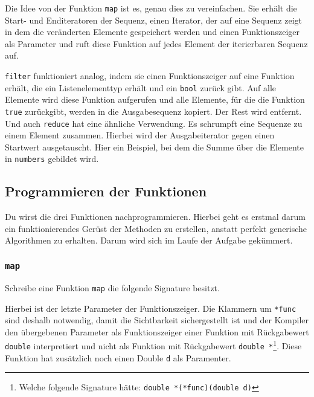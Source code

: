 Die Idee von der Funktion \lstinline{map} ist es, genau dies zu vereinfachen.
Sie erhält die Start- und Enditeratoren der Sequenz, einen Iterator, der auf eine Sequenz zeigt in dem die veränderten Elemente gespeichert werden und einen Funktionszeiger als Parameter und ruft diese Funktion auf jedes Element der iterierbaren Sequenz auf.



\lstinline{filter} funktioniert analog, indem sie einen Funktionszeiger auf eine Funktion erhält, die ein Listenelementtyp erhält und ein \lstinline{bool} zurück gibt.
Auf alle Elemente wird diese Funktion aufgerufen und alle Elemente, für die die Funktion \lstinline{true} zurückgibt, werden in die Ausgabesequenz kopiert. Der Rest wird entfernt. \\



Und auch \lstinline{reduce} hat eine ähnliche Verwendung.
Es schrumpft eine Sequenze zu einem Element zusammen.
Hierbei wird der Ausgabeiterator gegen einen Startwert ausgetauscht.
Hier ein Beispiel, bei dem die Summe über die Elemente in \lstinline{numbers} gebildet wird.



\subsection{Programmieren der Funktionen}
\label{sec:map-filter-reduce-basic-impl}

Du wirst die drei Funktionen nachprogrammieren.
Hierbei geht es erstmal darum ein funktionierendes Gerüst der Methoden zu erstellen, anstatt perfekt generische Algorithmen zu erhalten.
Darum wird sich im Laufe der Aufgabe gekümmert.

\subsubsection{\lstinline{map}}

Schreibe eine Funktion \lstinline{map} die folgende Signature besitzt.



Hierbei ist der letzte Parameter der Funktionszeiger.
Die Klammern um \lstinline{*func} sind deshalb notwendig, damit die Sichtbarkeit sichergestellt ist und der Kompiler den übergebenen Parameter als Funktionszeiger einer Funktion mit Rückgabewert \lstinline{double} interpretiert und nicht als Funktion mit Rückgabewert \lstinline{double *}\footnote{Welche folgende Signature hätte: \lstinline{double *(*func)(double d)}}.
Diese Funktion hat zusätzlich noch einen Double \lstinline{d} als Paramenter.

